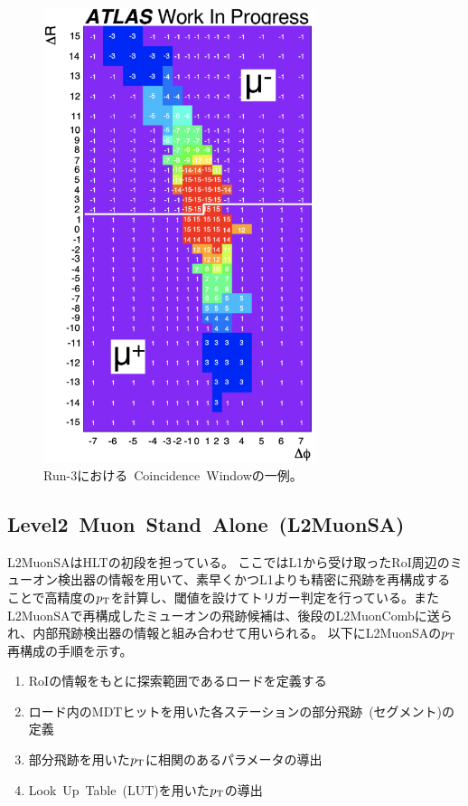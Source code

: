 \begin{figure}[h]
  \centering
  \includegraphics[clip, width=8cm]{fig/3/Run3CW.pdf}
  \caption{Run-3における~Coincidence~Windowの一例\cite{article:shiomi}。}
  \label{fig:3-5}
\end{figure}


\subsection{Level2~Muon~Stand~Alone~(L2MuonSA)}\label{chapter3-2-2}
L2MuonSAはHLTの初段を担っている。
ここではL1から受け取ったRoI周辺のミューオン検出器の情報を用いて、素早くかつL1よりも精密に飛跡を再構成することで高精度の$p_\mathrm{T}$を計算し、閾値を設けてトリガー判定を行っている。またL2MuonSAで再構成したミューオンの飛跡候補は、後段のL2MuonCombに送られ、内部飛跡検出器の情報と組み合わせて用いられる。
以下にL2MuonSAの$p_\mathrm{T}$再構成の手順を示す。
\begin{enumerate}
    \item RoIの情報をもとに探索範囲であるロードを定義する
    \item ロード内のMDTヒットを用いた各ステーションの部分飛跡~(セグメント)の定義
    \item 部分飛跡を用いた$p_\mathrm{T}$に相関のあるパラメータの導出
    \item Look~Up~Table~(LUT)を用いた$p_\mathrm{T}$の導出
\end{enumerate}

